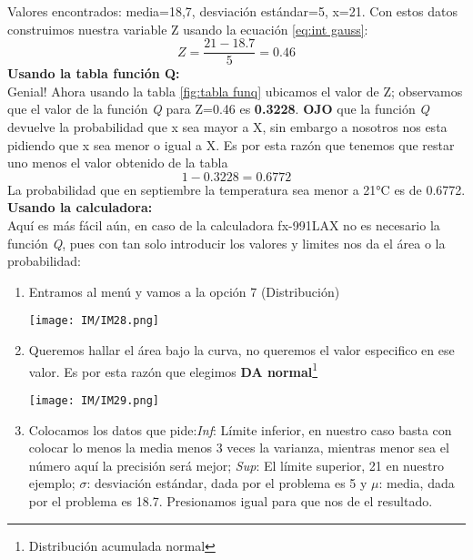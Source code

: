 \documentclass[
	12pt, %
	fleqn, %
	a4paper, %
	oneside, %
]{LegrandOrangeBook}
\begin{document}
\begin{example}
Valores encontrados: media=18,7, desviación estándar=5, x=21. Con estos datos construimos nuestra variable Z usando la ecuación \ref{eq:int gauss}:
\begin{displaymath}
Z=\frac{21-18.7}{5}=0.46
\end{displaymath}
\textbf{Usando la tabla función Q:}\\
Genial! Ahora usando la tabla \ref{fig:tabla funq} ubicamos el valor de Z; observamos que el valor de la función \textit{Q} para Z=0.46 es \textbf{0.3228}. \textbf{OJO} que la función \textit{Q} devuelve la probabilidad que x sea mayor a X, sin embargo a nosotros nos esta pidiendo que x sea menor o igual a X. Es por esta razón que tenemos que restar uno menos el valor obtenido de la tabla
\begin{displaymath}
1-0.3228=0.6772
\end{displaymath}
La probabilidad que en septiembre la temperatura sea menor a 21°C es de 0.6772.\\
\textbf{Usando la calculadora:}\\
Aquí es más fácil aún, en caso de la calculadora fx-991LAX no es necesario la función \textit{Q}, pues con tan solo introducir los valores y limites nos da el área o la probabilidad:
\begin{enumerate}
\item Entramos al menú y vamos a la opción 7 (Distribución)
\begin{center}
\texttt{[image: IM/IM28.png]}
\end{center}
\item Queremos hallar el área bajo la curva, no queremos el valor especifico en ese valor. Es por esta razón que elegimos \textbf{DA normal}\footnote{Distribución acumulada normal}
\begin{center}
\texttt{[image: IM/IM29.png]}
\end{center}
\item Colocamos los datos que pide:\textit{Inf}: Límite inferior, en nuestro caso basta con colocar lo menos la media menos 3 veces la varianza, mientras menor sea el número aquí la precisión será mejor; \textit{Sup}: El límite superior, 21 en nuestro ejemplo; $\sigma$: desviación estándar, dada por el problema es 5 y $\mu$: media, dada por el problema es 18.7. Presionamos igual para que nos de el resultado.

\end{enumerate}
\end{example}
\end{document}
